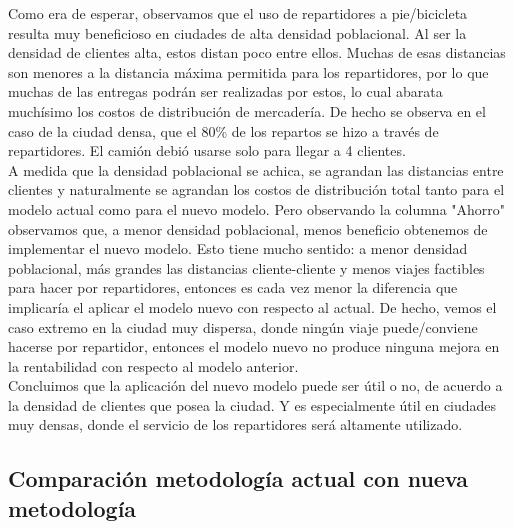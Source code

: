 \documentclass{article}
\begin{document}
Como era de esperar, observamos que el uso de repartidores a pie/bicicleta resulta muy beneficioso en ciudades de alta densidad poblacional. Al ser la densidad de clientes alta, estos distan poco entre ellos. Muchas de esas distancias son menores a la distancia máxima permitida para los repartidores, por lo que muchas de las entregas podrán ser realizadas por estos, lo cual abarata muchísimo los costos de distribución de mercadería. De hecho se observa en el caso de la ciudad densa, que el 80\% de los repartos se hizo a través de repartidores. El camión debió usarse solo para llegar a 4 clientes. \\
A medida que la densidad poblacional se achica, se agrandan las distancias entre clientes y naturalmente se agrandan los costos de distribución total tanto para el modelo actual como para el nuevo modelo. Pero observando la columna "Ahorro" observamos que, a menor densidad poblacional, menos beneficio obtenemos de implementar el nuevo modelo. Esto tiene mucho sentido: a menor densidad poblacional, más grandes las distancias cliente-cliente y menos viajes factibles para hacer por repartidores, entonces es cada vez menor la diferencia que implicaría el aplicar el modelo nuevo con respecto al actual. De hecho, vemos el caso extremo en la ciudad muy dispersa, donde ningún viaje puede/conviene hacerse por repartidor, entonces el modelo nuevo no produce ninguna mejora en la rentabilidad con respecto al modelo anterior. \\
Concluimos que la aplicación del nuevo modelo puede ser útil o no, de acuerdo a la densidad de clientes que posea la ciudad. Y es especialmente útil en ciudades muy densas, donde el servicio de los repartidores será altamente utilizado. 


\subsection{Comparación metodología actual con nueva metodología} 
\end{document}
